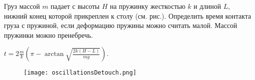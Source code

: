 \begin{ex}
Груз массой $m$ падает с высоты $H$ на пружинку жесткостью $k$ и длиной $L$, нижний конец которой прикреплен к столу (см. рис.). Определить время контакта груза с пружиной, если деформацию пружины можно считать малой. Массой пружинки можно пренебречь.
\begin{ans}
$t = 2\frac{m}{k}\left( \pi - \arctan \sqrt{\frac{2k(H-L)}{mg}}\right)$.
\end{ans}
\end{ex}	

\begin{figure}[h]
\centering
\texttt{[image: oscillationsDetouch.png]}
\label{oscillationsDetouch1}
\caption{}
\end{figure}

\clearpage
